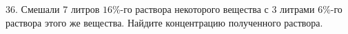 36. Смешали 7 литров $16\%$-го раствора некоторого вещества с 3 литрами $6\%$-го раствора этого же вещества. Найдите концентрацию полученного раствора.\\
